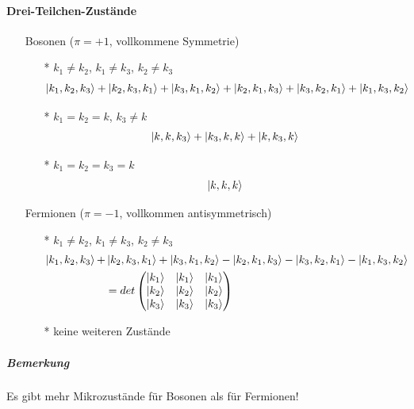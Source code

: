 \paragraph{Drei-Teilchen-Zustände}
\begin{itemize}
    \item[] Bosonen ($\pi=+1$, vollkommene Symmetrie)
    \begin{itemize}
        \item[*] $k_1 \neq k_2$, $k_1 \neq k_3$, $k_2 \neq k_3$
        \begin{equation}
            \ket{k_1,k_2,k_3} + \ket{k_2,k_3,k_1} + \ket{k_3,k_1,k_2} + \ket{k_2,k_1,k_3} + \ket{k_3,k_2,k_1} + \ket{k_1,k_3,k_2}
        \end{equation}
        \item[*] $k_1 = k_2 = k$, $k_3 \neq k$
        \begin{equation}
            \ket{k,k,k_3} + \ket{k_3,k,k} + \ket{k,k_3,k}
        \end{equation}
        \item[*] $k_1=k_2=k_3=k$
        \begin{equation}
            \ket{k,k,k}
        \end{equation}
    \end{itemize}
    \item[] Fermionen ($\pi = -1$, vollkommen antisymmetrisch)
    \begin{itemize}
        \item[*] $k_1 \neq k_2$, $k_1 \neq k_3$, $k_2 \neq k_3$
        \begin{align}
            \ket{k_1,k_2,k_3} + &\ket{k_2,k_3,k_1} + \ket{k_3,k_1,k_2} - \ket{k_2,k_1,k_3} - \ket{k_3,k_2,k_1} - \ket{k_1,k_3,k_2}\\
            &= det\begin{pmatrix}
                \ket{k_1} & \ket{k_1} & \ket{k_1}\\
                \ket{k_2} & \ket{k_2} & \ket{k_2}\\
                \ket{k_3} & \ket{k_3} & \ket{k_3}
            \end{pmatrix}
        \end{align}
        \item[*] keine weiteren Zustände
    \end{itemize}
\end{itemize}
\subparagraph{Bemerkung}
Es gibt mehr Mikrozustände für Bosonen als für Fermionen!

